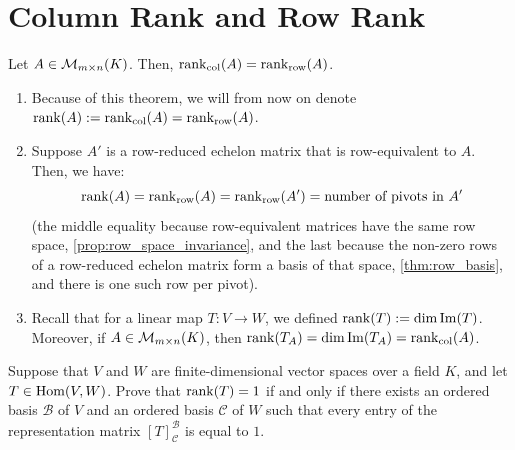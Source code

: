 \renewcommand{\thetheorem}{17.c.\arabic{theorem}}
\setcounter{theorem}{0}


\section{Column Rank and Row Rank}
\label{sec:column_row_rank}

\begin{theorem}
\label{thm:rank_row_column_equality}
Let $A \in \mathcal{M}_{m \times n}(K)$. Then, $\operatorname{rank}_{\text{col}}(A) = \operatorname{rank}_{\text{row}}(A)$.
\end{theorem}

\begin{remark}
\label{rem:rank_notation_and_properties}
\begin{enumerate}
    \item Because of this theorem, we will from now on denote $\operatorname{rank}(A) := \operatorname{rank}_{\text{col}}(A) = \operatorname{rank}_{\text{row}}(A)$.
    \item Suppose $A'$ is a row-reduced echelon matrix that is row-equivalent to $A$. Then, we have:
    \begin{equation*}
        \operatorname{rank}(A) = \operatorname{rank}_{\text{row}}(A) = \operatorname{rank}_{\text{row}}(A') = \text{number of pivots in } A'
    \end{equation*}
    (the middle equality because row-equivalent matrices have the same row space, \cref{prop:row_space_invariance}, and the last because the non-zero rows of a row-reduced echelon matrix form a basis of that space, \cref{thm:row_basis}, and there is one such row per pivot).
    \item Recall that for a linear map $T: V \to W$, we defined $\operatorname{rank}(T) := \dim \operatorname{Im}(T)$. Moreover, if $A \in \mathcal{M}_{m \times n}(K)$, then $\operatorname{rank}(T_A) = \dim \operatorname{Im}(T_A) = \operatorname{rank}_{\text{col}}(A)$.
\end{enumerate}
\end{remark}

\begin{exercise}
\label{exc:rank_one_all_ones_matrix}
Suppose that $V$ and $W$ are finite-dimensional vector spaces over a field $K$, and let $T \in \operatorname{Hom}(V, W)$.
Prove that $\operatorname{rank}(T) = 1$ if and only if there exists an ordered basis $\mathcal{B}$ of $V$ and an ordered basis $\mathcal{C}$ of $W$ such that every entry of the representation matrix $[T]_{\mathcal{C}}^{\mathcal{B}}$ is equal to $1$.
\end{exercise}

